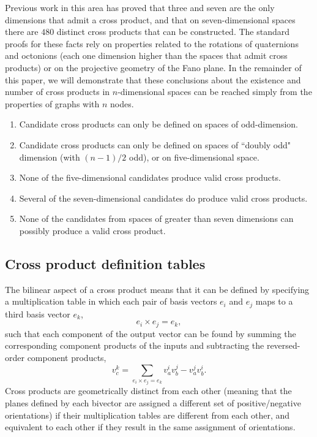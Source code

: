 \documentclass[11pt]{article}
\newcommand{\bv}[1][]{e_{#1}}
\newcommand{\vc}[1][]{v_{#1}}
\begin{document}
Previous work in this area has proved that three and seven are the only dimensions that admit a cross product, and that on seven-dimensional spaces there are $480$ distinct cross products that can be constructed. The standard proofs for these facts rely on properties related to the rotations of quaternions and octonions (each one dimension higher than the spaces that admit cross products) or on the projective geometry of the Fano plane. In the remainder of this paper, we will demonstrate that these conclusions about the existence and number of cross products in $n$-dimensional spaces can be reached simply from the properties of graphs with $n$ nodes.

\begin{enumerate}
\item Candidate cross products can only be defined on spaces of odd-dimension.
\item Candidate cross products can only be defined on spaces of ``doubly odd" dimension (with $(n-1)/2$ odd), or on five-dimensional space.
\item None of the five-dimensional candidates produce valid cross products.
\item Several of the seven-dimensional candidates do produce valid cross products.
\item None of the candidates from spaces of greater than seven dimensions can possibly produce a valid cross product.
\end{enumerate}

\subsection{Cross product definition tables}
The bilinear aspect of a cross product means that it can be defined by specifying a multiplication table in which each pair of basis vectors $\bv[i]$ and $\bv[j]$ maps to a third basis vector $\bv[k]$,
\begin{equation}
\bv[i] \times \bv[j] = \bv[k],
\end{equation}
such that each component of the output vector can be found by summing the corresponding component products of the inputs and subtracting the reversed-order component products,
\begin{equation}
\vc[c]^{k} = \sum_{\bv[i] \times \bv[j] = \bv[k]} \vc[a]^{i} \vc[b]^{j} - \vc[a]^{j} \vc[b]^{i}.
\end{equation}
Cross products are geometrically distinct from each other (meaning that the planes defined by each bivector are assigned a different set of positive/negative orientations) if their multiplication tables are different from each other, and equivalent to each other if they result in the same assignment of orientations.
\end{document}
